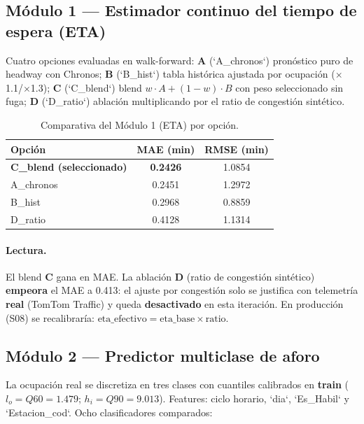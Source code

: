 \documentclass[11pt]{article}
\begin{document}
\subsection{Módulo 1 --- Estimador continuo del tiempo de espera (ETA)}
Cuatro opciones evaluadas en walk-forward: \textbf{A} (`A\_chronos`) pronóstico puro de headway con
Chronos; \textbf{B} (`B\_hist`) tabla histórica ajustada por ocupación ($\times$1.1/$\times$1.3);
\textbf{C} (`C\_blend`) blend $w\cdot A + (1-w)\cdot B$ con peso seleccionado sin fuga;
\textbf{D} (`D\_ratio`) ablación multiplicando por el ratio de congestión sintético.

\begin{table}[H]
\centering
\caption{Comparativa del Módulo 1 (ETA) por opción.}
\label{tab:eta}
\begin{tabularx}{\textwidth}{lcc}
\toprule
\textbf{Opción} & \textbf{MAE (min)} & \textbf{RMSE (min)} \\
\midrule
\textbf{C\_blend (seleccionado)} & \textbf{0.2426} & 1.0854 \\
A\_chronos & 0.2451 & 1.2972 \\
B\_hist & 0.2968 & 0.8859 \\
D\_ratio & 0.4128 & 1.1314 \\
\bottomrule
\end{tabularx}
\end{table}

\paragraph{Lectura.} El blend \textbf{C} gana en MAE. La ablación \textbf{D} (ratio de congestión
sintético) \textbf{empeora} el MAE a 0.413: el ajuste por congestión solo se justifica con telemetría
\textbf{real} (TomTom Traffic) y queda \textbf{desactivado} en esta iteración. En producción
(S08) se recalibraría: $\text{eta\_efectivo} = \text{eta\_base} \times \text{ratio}$.

\subsection{Módulo 2 --- Predictor multiclase de aforo}
La ocupación real se discretiza en tres clases con cuantiles calibrados en \textbf{train}
($l_o = Q60 = 1.479$; $h_i = Q90 = 9.013$). Features: ciclo horario, `dia`, `Es\_Habil` y
`Estacion\_cod`. Ocho clasificadores comparados:
\end{document}
